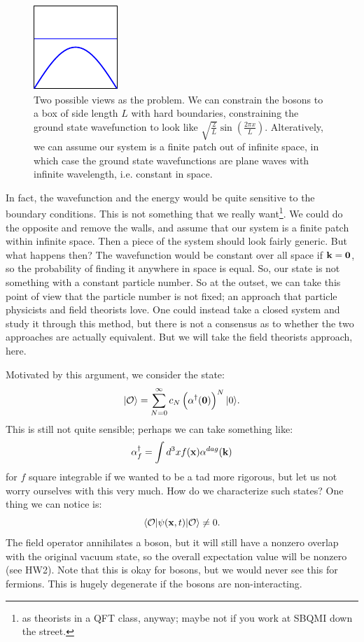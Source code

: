 \begin{figure}[htbp]
    \centering
    \includegraphics[]{Images/fig-bosonBC.pdf}

    \caption{Two possible views as the problem. We can constrain the bosons to a box of side length $L$ with hard boundaries, constraining the ground state wavefunction to look like $\sqrt{\frac{2}{L}}\sin(\frac{2\pi x}{L})$. Alteratively, we can assume our system is a finite patch out of infinite space, in which case the ground state wavefunctions are plane waves with infinite wavelength, i.e. constant in space.}
    \label{fig-bosonBC}
\end{figure}

In fact, the wavefunction and the energy would be quite sensitive to the boundary conditions. This is not something that we really want\footnote{as theorists in a QFT class, anyway; maybe not if you work at SBQMI down the street.}. We could do the opposite and remove the walls, and assume that our system is a finite patch within infinite space. Then a piece of the system should look fairly generic. But what happens then? The wavefunction would be constant over all space if $\mathbf{k} = \mathbf{0}$, so the probability of finding it anywhere in space is equal. So, our state is not something with a constant particle number. So at the outset, we can take this point of view that the particle number is not fixed; an approach that particle physicists and field theorists love. One could instead take a closed system and study it through this method, but there is not a consensus as to whether the two approaches are actually equivalent. But we will take the field theorists approach, here.

Motivated by this argument, we consider the state:
\begin{equation}
    \lvert \mathcal{O} \rangle = \sum_{N=0}^\infty c_N\left(\alpha^\dagger(\mathbf{0})\right)^N \lvert 0 \rangle.
\end{equation}
This is still not quite sensible; perhaps we can take something like:
\begin{equation}
    \alpha_f^\dagger = \int d^3x f(\mathbf{x})\alpha^{dag}(\mathbf{k})
\end{equation}
for $f$ square integrable if we wanted to be a tad more rigorous, but let us not worry ourselves with this very much. How do we characterize such states? One thing we can notice is:
\begin{equation}
    \langle \mathcal{O} \rvert\psi(\mathbf{x}, t)\lvert \mathcal{O} \rangle \neq 0.
\end{equation}
The field operator annihilates a boson, but it will still have a nonzero overlap with the original vacuum state, so the overall expectation value will be nonzero (see HW2). Note that this is okay for bosons, but we would never see this for fermions. This is hugely degenerate if the bosons are non-interacting. 

